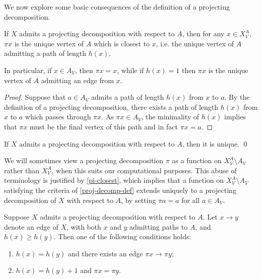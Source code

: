 We now explore some basic consequences of the definition of a projecting decomposition.

\begin{lemma}\label{pi-closest}
If $X$ admits a projecting decomposition with respect to $A$, then for any $x \in X_{V}^A$, $\pi x$ is the unique vertex of $A$ which is closest to $x$, i.e. the unique vertex of $A$ admitting a path of length $h(x)$.

In particular, if $x \in A_V$, then $\pi x = x$, while if $h(x) = 1$ then $\pi x$ is the unique vertex of $A$ admitting an edge from $x$.
\end{lemma}

\begin{proof}
Suppose that $a \in A_V$ admits a path of length $h(x)$ from $x$ to $a$. By the definition of a projecting decomposition, there exists a path of length $h(x)$ from $x$ to $a$ which passes through $\pi x$. As $\pi x \in A_V$, the minimality of $h(x)$ implies that $\pi x$ must be the final vertex of this path and in fact $\pi x = a$.
\end{proof}

\begin{corollary}
If $X$ admits a projecting decomposition with respect to $A$, then it is unique. \qed
\end{corollary}

\begin{remark}\label{rmk:projecting_alternative} We will sometimes view a projecting decomposition $\pi$ as a function on $X^A_V \setminus A_V$ rather than $X^A_V$, when this suits our computational purposes. This abuse of terminology is justified by \cref{pi-closest}, which implies that a function on $X^A_V \setminus A_V$ satisfying the criteria of \cref{proj-decomp-def} extends uniquely to a projecting decomposition of $X$ with respect to $A$, by setting $\pi a = a$ for all $a \in A_V$.
\end{remark}

\begin{lemma}\label{pi-edges}
Suppose $X$ admits a projecting decomposition with respect to $A$.
Let $x \to y$ denote an edge of $X$, with both $x$ and $y$ admitting paths to $A$, and $h(x) \geq h(y)$.
Then one of the following conditions holds:
\begin{enumerate}
    \item \label{pi-edges-equal} $h(x) = h(y)$ and there exists an edge $\pi x \to \pi y$;
    \item \label{pi-edges-greater} $h(x) = h(y) + 1$ and $\pi x = \pi y$.
\end{enumerate}
\end{lemma}

